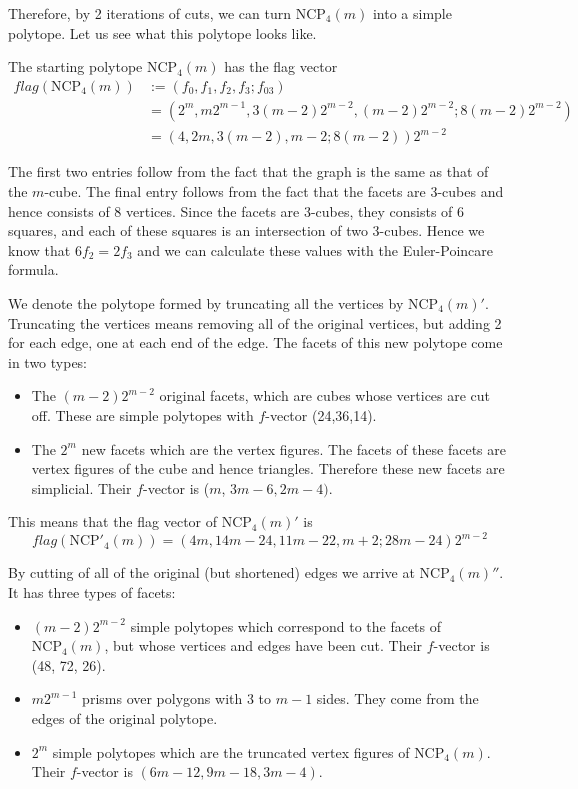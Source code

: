 \documentclass[a4paper,12pt]{book}
\theoremstyle{plain}
\theoremstyle{definition}
\newcommand\NC{\textrm{NCP}}
\begin{document}
Therefore, by 2 iterations of cuts, we can turn $\NC_4(m)$ into a simple 
polytope. Let us see what this polytope looks like. 

The starting polytope $\NC_4(m)$ has the flag vector 
\begin{align*}
 flag(\NC_4(m)) &:= (f_0, f_1, f_2, f_3; f_{03}) \\
	&= (2^m, m2^{m-1}, 3(m-2)2^{m-2}, (m-2)2^{m-2}; 8(m-2)2^{m-2}) \\
	&= (4, 2m, 3(m-2), m-2; 8(m-2))2^{m-2}
\end{align*}

The first two entries follow from the fact that the graph is the same as that 
of the $m$-cube. The final entry follows from the fact that the facets are 
3-cubes and hence consists of 8 vertices. Since the facets are 3-cubes, they 
consists of 6 squares, and each of these squares is an intersection of two 
3-cubes. Hence we know that $6f_2 = 2f_3$ and we can calculate these values with 
the Euler-Poincare formula.

We denote the polytope formed by truncating all the vertices by $\NC_4(m)'$.
Truncating the vertices means removing all of the original vertices, but 
adding 2 for each edge, one at each end of the edge. The facets of this new 
polytope come in two types:

\begin{itemize}
 \item The $(m-2)2^{m-2}$ original facets, which are cubes whose vertices are 
cut off. These are simple polytopes with $f$-vector (24,36,14).
 \item The $2^m$ new facets which are the vertex figures. The facets of these 
facets are vertex figures of the cube and hence triangles. Therefore these 
new facets are simplicial. Their $f$-vector is ($m$, 
$3m-6, 2m-4)$.
\end{itemize}

This means that the flag vector of $\NC_4(m)'$ is 
\begin{equation}
 flag(\NC'_4(m)) = (4m, 14m-24, 11m-22, m+2; 28m-24)2^{m-2}
\end{equation}

By cutting of all of the original (but shortened) edges we arrive at 
$\NC_4(m)''$. It has three types of facets:

\begin{itemize}
 \item $(m-2)2^{m-2}$ simple polytopes which correspond to the facets of 
$\NC_4(m)$, but whose vertices and edges have been cut. Their $f$-vector is 
(48, 72, 26).
\item $m2^{m-1}$ prisms over polygons with $3$ to $m-1$ sides. They come from 
the edges of the original polytope.
\item $2^m$ simple polytopes which are the truncated vertex figures of 
$\NC_4(m)$. Their $f$-vector is $(6m - 12, 9m-18, 3m-4)$.
\end{itemize}
\end{document}
